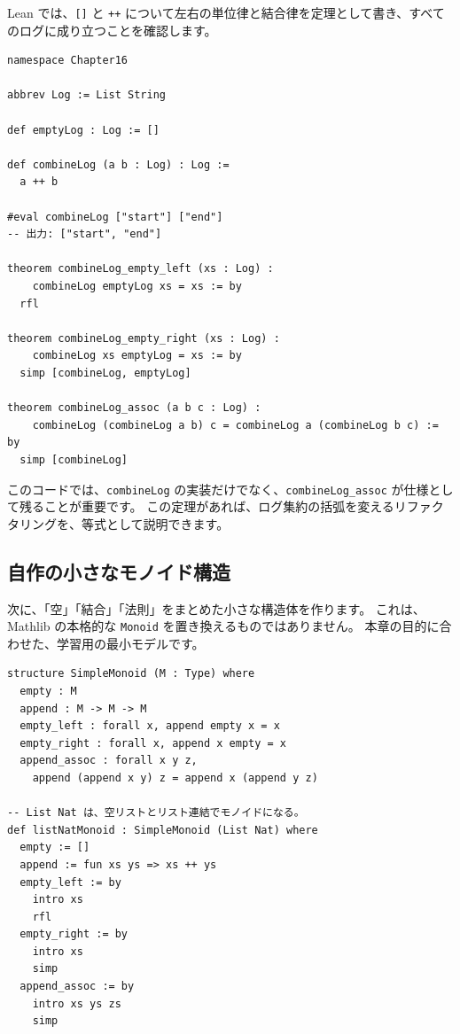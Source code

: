 Lean では、\texttt{[]} と \texttt{++} について左右の単位律と結合律を定理として書き、すべてのログに成り立つことを確認します。

\begin{listing}[htbp]
\begin{verbatim}
namespace Chapter16

abbrev Log := List String

def emptyLog : Log := []

def combineLog (a b : Log) : Log :=
  a ++ b

#eval combineLog ["start"] ["end"]
-- 出力: ["start", "end"]

theorem combineLog_empty_left (xs : Log) :
    combineLog emptyLog xs = xs := by
  rfl

theorem combineLog_empty_right (xs : Log) :
    combineLog xs emptyLog = xs := by
  simp [combineLog, emptyLog]

theorem combineLog_assoc (a b c : Log) :
    combineLog (combineLog a b) c = combineLog a (combineLog b c) := by
  simp [combineLog]
\end{verbatim}
\caption{\texttt{combineLog} のモノイド則}
\label{lst:ch16_log_laws}
\end{listing}

このコードでは、\texttt{combineLog} の実装だけでなく、\texttt{combineLog\_assoc} が仕様として残ることが重要です。
この定理があれば、ログ集約の括弧を変えるリファクタリングを、等式として説明できます。

\subsection{自作の小さなモノイド構造}

次に、「空」「結合」「法則」をまとめた小さな構造体を作ります。
これは、Mathlib の本格的な \texttt{Monoid} を置き換えるものではありません。
本章の目的に合わせた、学習用の最小モデルです。

\begin{listing}[htbp]
\begin{verbatim}
structure SimpleMonoid (M : Type) where
  empty : M
  append : M -> M -> M
  empty_left : forall x, append empty x = x
  empty_right : forall x, append x empty = x
  append_assoc : forall x y z,
    append (append x y) z = append x (append y z)

-- List Nat は、空リストとリスト連結でモノイドになる。
def listNatMonoid : SimpleMonoid (List Nat) where
  empty := []
  append := fun xs ys => xs ++ ys
  empty_left := by
    intro xs
    rfl
  empty_right := by
    intro xs
    simp
  append_assoc := by
    intro xs ys zs
    simp
\end{verbatim}
\caption{\texttt{SimpleMonoid}}
\label{lst:ch16_simple_monoid}
\end{listing}

